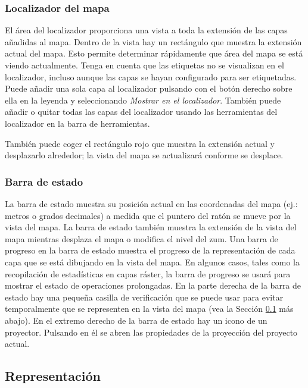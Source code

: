 \subsubsection{Localizador del mapa}\label{label_mapoverview}

El área del localizador proporciona una vista a toda la extensión de las capas añadidas al mapa. Dentro de la 
vista hay un rectángulo que muestra la extensión actual del mapa. Esto permite determinar rápidamente que área 
del mapa se está viendo actualmente. Tenga en cuenta que las etiquetas no se visualizan en el localizador, 
incluso aunque las capas se hayan configurado para ser etiquetadas. Puede añadir una sola capa al localizador 
pulsando con el botón derecho sobre ella en la leyenda y seleccionando \textit{Mostrar en el localizador}. 
También puede añadir o quitar todas las capas del localizador usando las herramientas del localizador en 
la barra de herramientas.

También puede coger el rectángulo rojo que muestra la extensión actual y desplazarlo alrededor; la vista 
del mapa se actualizará conforme se desplace.

\subsubsection{Barra de estado}\label{label_statusbar}

La barra de estado muestra su posición actual en las coordenadas del mapa (ej.: metros o grados decimales) a medida 
que el puntero del ratón se mueve por la vista del mapa. La barra de estado también muestra la extensión de 
la vista del mapa mientras desplaza el mapa o modifica el nivel del zum. Una barra de progreso en la barra 
de estado muestra el progreso de la representación de cada capa que se está dibujando en la vista del mapa. En algunos 
casos, tales como la recopilación de estadísticas en capas ráster, la barra de progreso se usará para mostrar el 
estado de operaciones prolongadas. En la parte derecha de la barra de estado hay una pequeña casilla de verificación 
que se puede usar para evitar temporalmente que se representen en la vista del mapa (vea la Sección 
\ref{subsec:redraw_events} más abajo). En el extremo derecho de la barra de estado hay un icono de un proyector. 
Pulsando en él se abren las propiedades de la proyección del proyecto actual.

\subsection{Representación}\label{subsec:redraw_events}

